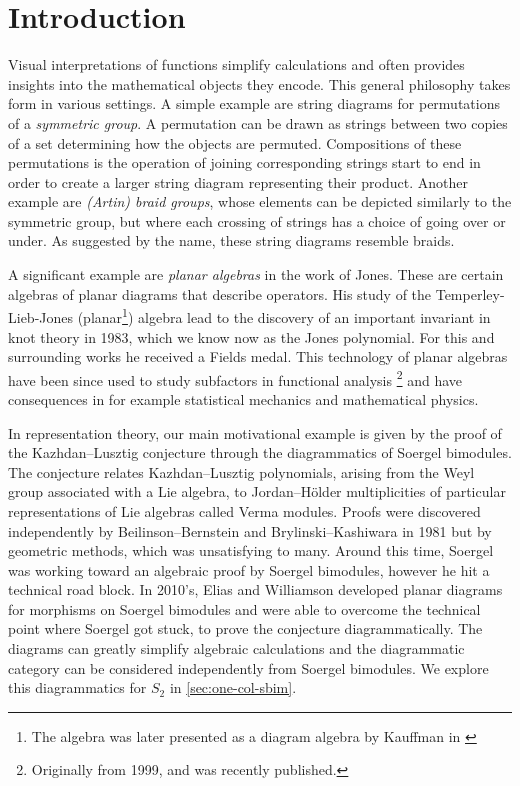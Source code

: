 \chapter{Introduction}

Visual interpretations of functions simplify calculations and often provides insights into the mathematical objects they encode.  This general philosophy takes form in various settings. A simple example are string diagrams for permutations of a \textit{symmetric group}. A permutation can be drawn as strings between two copies of a set determining how the objects are permuted. Compositions of these permutations is the operation of joining corresponding strings start to end in order to create a larger string diagram representing their product. Another example are \textit{(Artin) braid groups}, whose elements can be depicted similarly to the symmetric group, but where each crossing of strings has a choice of going over or under. As suggested by the name, these string diagrams resemble braids.

A significant example are \textit{planar algebras} in the work of Jones. These are certain algebras of planar diagrams that describe operators. His study of the Temperley-Lieb-Jones (planar\footnote{The algebra was later presented as a diagram algebra by Kauffman in \cite{kauffman-tl-planar-algebra}}) algebra lead to the discovery of an important invariant in knot theory \cite{jones-knot-polynomial} in 1983, which we know now as the Jones polynomial. For this and surrounding works he received a Fields medal. This technology of planar algebras have been since used to study subfactors in functional analysis \cite{jones-planar-algebra}\footnote{Originally from 1999, and was recently published.} and have consequences in for example statistical mechanics and mathematical physics.

In representation theory, our main motivational example is given by the proof of the Kazhdan--Lusztig conjecture through the diagrammatics of Soergel bimodules. The conjecture relates Kazhdan--Lusztig polynomials, arising from the Weyl group associated with a Lie algebra, to Jordan--H\"older multiplicities of particular representations of Lie algebras called Verma modules. Proofs were discovered independently by Beilinson--Bernstein and Brylinski--Kashiwara in 1981 but by geometric methods, which was unsatisfying to many. Around this time, Soergel was working toward an algebraic proof by Soergel bimodules, however he hit a technical road block. In 2010's, Elias and Williamson  developed planar diagrams for morphisms on Soergel bimodules and were able to overcome the technical point where Soergel got stuck, to prove the conjecture diagrammatically. The diagrams can greatly simplify algebraic calculations and the diagrammatic category can be considered independently from Soergel bimodules. We explore this diagrammatics for $S_2$ in \autoref{sec:one-col-sbim}.

